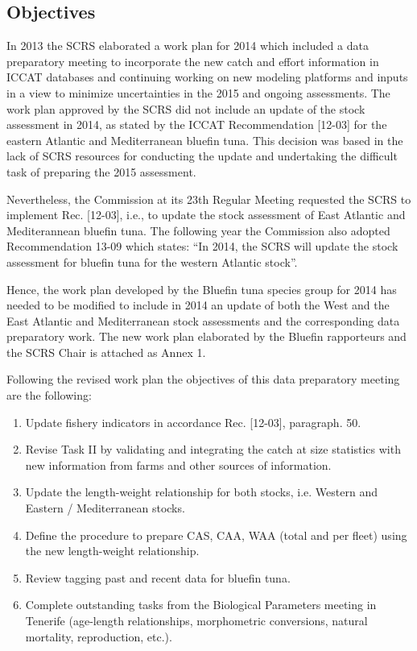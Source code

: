 

\subsection{Objectives}

In 2013 the SCRS elaborated a work plan for 2014 which included a data preparatory meeting to incorporate the new catch and effort information in ICCAT databases and continuing working on new modeling platforms and inputs in a view to minimize uncertainties in the 2015 and ongoing assessments. The work plan approved by the SCRS did not include an update of the stock assessment in 2014, as stated by the ICCAT Recommendation [12-03] for the eastern Atlantic and Mediterranean bluefin tuna. This decision was based in the lack of SCRS resources for conducting the update and undertaking the difficult task of preparing the 2015 assessment. 

Nevertheless, the Commission at its 23th Regular Meeting requested the SCRS to implement Rec. [12-03], i.e., to update the stock assessment of East Atlantic and Mediterannean bluefin tuna. The following year the Commission also adopted Recommendation 13-09 which states: “In 2014, the SCRS will update the stock assessment for bluefin tuna for the western Atlantic stock”.

Hence, the work plan developed by the Bluefin tuna species group for 2014 has needed to be modified to include in 2014 an update of both the West and the East Atlantic and Mediterranean stock assessments and the corresponding data preparatory work. The new work plan elaborated by the Bluefin rapporteurs and the SCRS Chair is attached as Annex 1. 

Following the revised work plan the objectives of this data preparatory meeting are the following: 

\begin{enumerate}[1.]
\item Update fishery indicators in accordance Rec. [12-03], paragraph. 50. 
\item Revise Task II by validating and integrating the catch at size statistics with new information from farms and other sources of information. 
\item Update the length-weight relationship for both stocks, i.e. Western and Eastern / Mediterranean stocks. 
\item Define the procedure to prepare CAS, CAA, WAA (total and per fleet) using the new length-weight relationship. 
\item Review tagging past and recent data for bluefin tuna.
\item Complete outstanding tasks from the Biological Parameters meeting in Tenerife (age-length relationships, morphometric conversions, natural mortality, reproduction, etc.). 
\end{enumerate}

